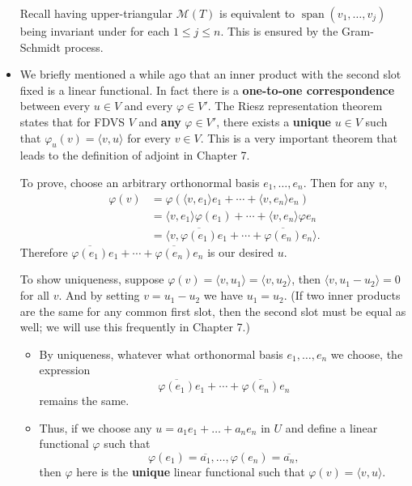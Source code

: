 \documentclass{article}
\newcommand{\s}{\operatorname{span}}
\newcommand{\conj}[1]{\overline{#1}}
\newcommand{\inp}[2]{\langle #1, #2 \rangle}
\newcommand{\M}{\mathcal{M}}
\renewcommand{\phi}{\varphi}
\begin{document}
\begin{itemize}
    Recall having upper-triangular $\M(T)$ is equivalent to $\s(v_1,\dots,v_j)$ being invariant under for each $1 \leq j \leq n$. This is ensured by the Gram-Schmidt process.
    
    
    \item We briefly mentioned a while ago that an inner product with the second slot fixed is a linear functional. In fact there is a \textbf{one-to-one correspondence} between every $u \in V$ and every $\phi \in V'$. The Riesz representation theorem states that for FDVS $V$ and \textbf{any} $\phi \in V'$, there exists a \textbf{unique} $u \in V$ such that $\phi_u(v) = \inp{v}{u}$ for every $v \in V$. This is a very important theorem that leads to the definition of adjoint in Chapter 7.
    
    To prove, choose an arbitrary orthonormal basis $e_1,\dots,e_n$. Then for any $v$,
    \begin{align*}
        \phi(v) & = \phi(\inp{v}{e_1}e_1+\cdots+\inp{v}{e_n}e_n) \\ & = \inp{v}{e_1}\phi(e_1)+\cdots+\inp{v}{e_n}\phi{e_n} \\ & = \inp{v}{\conj{\phi(e_1)}e_1+\cdots+\conj{\phi(e_n)}e_n}.
    \end{align*}
    Therefore $\conj{\phi(e_1)}e_1+\cdots+\conj{\phi(e_n)}e_n$ is our desired $u$.
    
    To show uniqueness, suppose $\phi(v) = \inp{v}{u_1} = \inp{v}{u_2}$, then $\inp{v}{u_1 - u_2} = 0$ for all $v$. And by setting $v = u_1 - u_2$ we have $u_1 = u_2$. (If two inner products are the same for any common first slot, then the second slot must be equal as well; we will use this frequently in Chapter 7.)
    \begin{itemize}
        \item By uniqueness, whatever what orthonormal basis $e_1,\dots,e_n$ we choose, the expression $$\conj{\phi(e_1)}e_1+\cdots+\conj{\phi(e_n)}e_n$$ remains the same.
        \item Thus, if we choose any $u = a_1 e_1 + \dots + a_n e_n$ in $U$ and define a linear functional $\phi$ such that $$\phi(e_1)=\conj{a_1},\dots,\phi(e_n)=\conj{a_n},$$ then $\phi$ here is the \textbf{unique} linear functional such that $\phi(v) = \inp{v}{u}$.
    \end{itemize}
\end{itemize}
\end{document}
